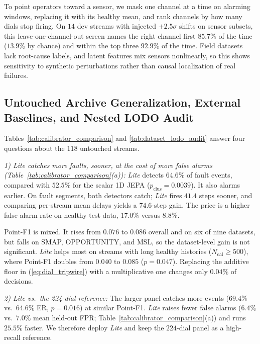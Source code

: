 \documentclass[journal]{IEEEtran}
\begin{document}
To point operators toward a sensor, we mask one channel at a time on alarming windows, replacing it with its healthy mean, and rank channels by how many dials stop firing. On $14$ dev streams with injected $+2.5\sigma$ shifts on sensor subsets, this leave-one-channel-out screen names the right channel first $85.7\%$ of the time ($13.9\%$ by chance) and within the top three $92.9\%$ of the time. Field datasets lack root-cause labels, and latent features mix sensors nonlinearly, so this shows sensitivity to synthetic perturbations rather than causal localization of real failures.

\subsection{Untouched Archive Generalization, External Baselines, and Nested LODO Audit}
\label{subsec:calibration_realities}





Tables~\ref{tab:calibrator_comparison} and \ref{tab:dataset_lodo_audit} answer four questions about the $118$ untouched streams.

\noindent\emph{1) Lite catches more faults, sooner, at the cost of more false alarms (Table~\ref{tab:calibrator_comparison}(a)):} \emph{Lite} detects $64.6\%$ of fault events, compared with $52.5\%$ for the scalar 1D JEPA ($p_{\text{clus}}=0.0039$). It also alarms earlier. On fault segments, both detectors catch; \emph{Lite} fires $41.4$ steps sooner, and comparing per-stream mean delays yields a $74.6$-step gain. The price is a higher false-alarm rate on healthy test data, $17.0\%$ versus $8.8\%$.

Point-F1 is mixed. It rises from $0.076$ to $0.086$ overall and on six of nine datasets, but falls on SMAP, OPPORTUNITY, and MSL, so the dataset-level gain is not significant. \emph{Lite} helps most on streams with long healthy histories ($N_{\text{cal}}\ge 500$), where Point-F1 doubles from $0.040$ to $0.085$ ($p=0.047$). Replacing the additive floor in (\ref{eq:dial_tripwire}) with a multiplicative one changes only $0.04\%$ of decisions.

\noindent\emph{2) Lite vs.\ the 224-dial reference:} The larger panel catches more events ($69.4\%$ vs.\ $64.6\%$ ER, $p=0.016$) at similar Point-F1. \emph{Lite} raises fewer false alarms ($6.4\%$ vs.\ $7.0\%$ mean held-out FPR; Table~\ref{tab:calibrator_comparison}(a)) and runs $25.5\%$ faster. We therefore deploy \emph{Lite} and keep the $224$-dial panel as a high-recall reference.
\end{document}
